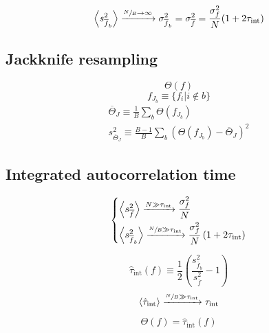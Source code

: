\[
    \left<s_{\overline f_b}^2\right> \xrightarrow{\sfrac{N}{B}\to\infty} \sigma_{\overline f_b}^2 = \sigma_{\overline f}^2 = \frac{\sigma_f^2}{N}(1+2\tau_\mathrm{int})
\]


\subsection*{Jackknife resampling} 
\[
    \Theta(f)
\]
\[
    f_{J_b} \equiv \{f_i | i\notin b\}
\]
\[\begin{gathered}
    \overline \Theta_J \equiv \frac{1}{B} \sum_b \Theta(f_{J_b}) \\
    s_{\overline \Theta_J}^2 \equiv \frac{B-1}{B}\sum_b \left(\Theta(f_{J_b})-\overline\Theta_J\right)^2
\end{gathered}\]

\subsection*{Integrated autocorrelation time}
\[\begin{dcases}
    \left<s_{\overline f}^2\right> \xrightarrow{N\gg\tau_\mathrm{int}} \frac{\sigma_f^2}{N} \\
    \left<s_{\overline f_b}^2\right> \xrightarrow{\sfrac{N}{B}\gg\tau_\mathrm{int}} \frac{\sigma_f^2}{N}\left(1+2\tau_\mathrm{int}\right)
\end{dcases}\]

\[
    \hat\tau_\mathrm{int}(f) \equiv \frac{1}{2}\left(\frac{s_{\overline f_b}^2}{s_{\overline f}^2}-1\right) 
\]
\[
    \left<\hat\tau_\mathrm{int}\right> \xrightarrow{\sfrac{N}{B}\gg\tau_\mathrm{int}} \tau_\mathrm{int}
\]

\[
    \Theta(f) = \hat\tau_\mathrm{int}(f)
\]


